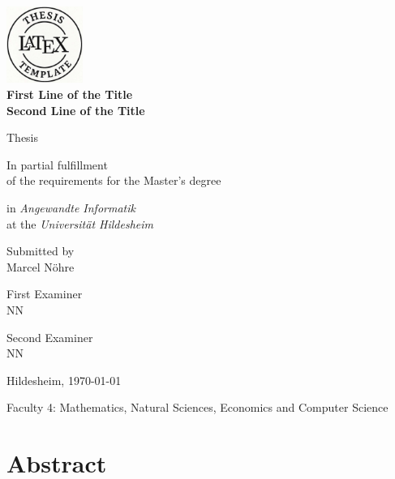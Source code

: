 \documentclass[11pt,        %
  ngerman,english,          %
  paper=a4,                 %
  captions=tablesignature,  %
  listof=numbered,          %
  bibliography=totoc,       %
  headings=small,           %
  headinclude=false,        %
  footinclude=false,        %
  parskip=half-,            %
  oneside,                  %
  BCOR=15mm,                %
  DIV=12                    %
  ]{scrbook}                %
\begin{document}
\frontmatter

\begin{titlepage}
  \begin{center}
    \includegraphics[width=2.5cm]{figures/logo.pdf}\\
    \vfill
    {
      \Large
      \bfseries
      First Line of the Title\\    
      Second Line of the Title
      \vspace{0.25cm}
      \normalsize
      \mdseries
    }
    \vfill
    {
      \normalsize
      Thesis
      
      In partial fulfillment\\
      of the requirements for the Master's degree

      in \textit{Angewandte Informatik}\\
      at the \textit{Universität Hildesheim}

      \vfill

      Submitted by\\
      Marcel Nöhre

      \vfill

      First Examiner\\
      NN

      Second Examiner\\
      NN

      \vfill

      Hildesheim, \today
    }

      \vfill

    {
      \footnotesize 

      \vfill

      Faculty 4: Mathematics, Natural Sciences, Economics and Computer Science
    }
  \end{center}
\end{titlepage}
\chapter*{Abstract}
\vfill
\end{document}
